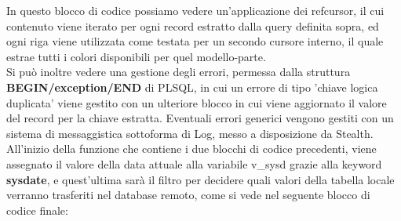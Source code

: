 In questo blocco di codice possiamo vedere un'applicazione dei refcursor, il cui contenuto viene iterato per ogni record estratto dalla query definita sopra, ed ogni riga viene utilizzata come testata per un secondo cursore interno, il quale estrae tutti i colori disponibili per quel modello-parte.\\
Si può inoltre vedere una gestione degli errori, permessa dalla struttura \textbf{BEGIN/exception/END} di PLSQL, in cui un errore di tipo 'chiave logica duplicata' viene gestito con un ulteriore blocco in cui viene aggiornato il valore del record per la chiave estratta. Eventuali errori generici vengono gestiti con un sistema di messaggistica sottoforma di Log, messo a disposizione da Stealth.\\
All'inizio della funzione che contiene i due blocchi di codice precedenti, viene assegnato il valore della data attuale alla variabile v\_sysd grazie alla keyword \textbf{sysdate}, e quest'ultima sarà il filtro per decidere quali valori della tabella locale verranno trasferiti nel database remoto, come si vede nel seguente blocco di codice finale:
